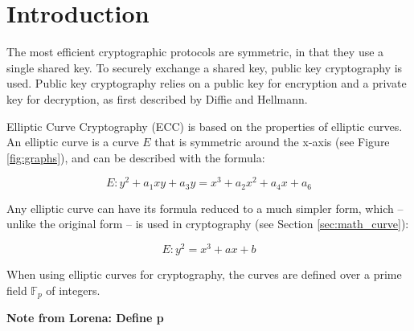 \section{Introduction}

The most efficient cryptographic protocols are symmetric, in that they use a single shared key.
To securely exchange a shared key, public key cryptography is used. Public key cryptography
relies on a public key for encryption and a private key for decryption, as first described by
Diffie and Hellmann.

Elliptic Curve Cryptography (ECC) is based on the properties of elliptic curves.
An elliptic curve is a curve \(E\) that is symmetric around the x-axis (see Figure \ref{fig:graphs}),
and can be described with the formula:

\begin{equation}
	E: y^2 + a_1xy + a_3y = x^3 + a_2x^2 + a_4x + a_6
\end{equation}

Any elliptic curve can have its formula reduced to a much simpler form, which -- unlike the original
form -- is used in cryptography (see Section \ref{sec:math_curve}):

\begin{equation}
	E: y^2 = x^3 + ax + b
\end{equation}

When using elliptic curves for cryptography, the curves are defined over a prime field \(\mathbb{F}_p\)
of integers.

\textbf{Note from Lorena: Define p}

